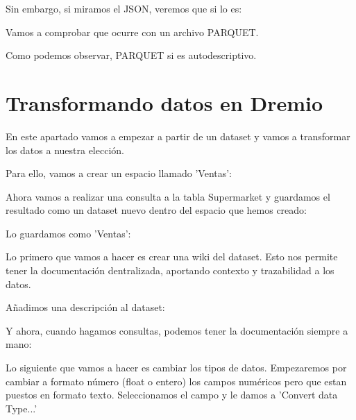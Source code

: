 \documentclass{../../../miPlantilla}
\begin{document}

Sin embargo, si miramos el JSON, veremos que si lo es:


Vamos a comprobar que ocurre con un archivo PARQUET.


Como podemos observar, PARQUET si es autodescriptivo.

\newpage

\section{Transformando datos en Dremio}
En este apartado vamos a empezar a partir de un dataset y vamos a transformar los datos a nuestra elección.

Para ello, vamos a crear un espacio llamado 'Ventas':


Ahora vamos a realizar una consulta a la tabla Supermarket y guardamos el resultado como un dataset nuevo dentro del espacio que hemos creado:


\newpage

Lo guardamos como 'Ventas':


Lo primero que vamos a hacer es crear una wiki del dataset. Esto nos permite tener la documentación dentralizada, aportando contexto y 
trazabilidad a los datos.


\newpage

Añadimos una descripción al dataset:


Y ahora, cuando hagamos consultas, podemos tener la documentación siempre a mano:


\newpage

Lo siguiente que vamos a hacer es cambiar los tipos de datos. Empezaremos por cambiar a formato número (float o entero) los campos numéricos
pero que estan puestos en formato texto. Seleccionamos el campo y le damos a 'Convert data Type...'


\newpage
\end{document}

